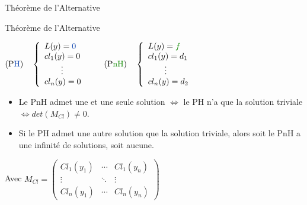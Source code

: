 \documentclass[10pt]{beamer}
\begin{document}
\begin{frame}{Théorème de l'Alternative}
\begin{alertblock}{Théorème de l'Alternative}
\begin{center}
$(\text{P\bleu{H}}) \quad \left\{ \begin{array}{l}
L(y) = \bleu{0} \\
cl_1(y) = 0  \\
 \qquad\vdots \\
cl_n(y) = 0
\end{array}\right. \qquad 
(\text{P\green{nH}}) \quad \left\{ \begin{array}{l}
L(y) = \green{f} \\
cl_1(y) = d_1  \\
 \qquad\vdots \\
cl_n(y) = d_2
\end{array}\right.$
\end{center}

\begin{itemize}
\item Le PnH admet une et une seule solution $\iff$ le PH n'a que la solution triviale $\iff det(M_{\mathit{Cl}}) \neq 0 $.
\item Si le PH admet une autre solution que la solution triviale, alors soit le PnH a une infinité de solutions, soit aucune.
\end{itemize} 
\end{alertblock}
Avec $M_{\mathit{Cl}} = \begin{pmatrix}
\mathit{Cl}_1(y_1) & \cdots & \mathit{Cl}_1 (y_n) \\
\vdots & \ddots & \vdots \\
\mathit{Cl}_n(y_1) & \cdots & \mathit{Cl}_n (y_n) 
\end{pmatrix}$
\end{frame}
\end{document}
